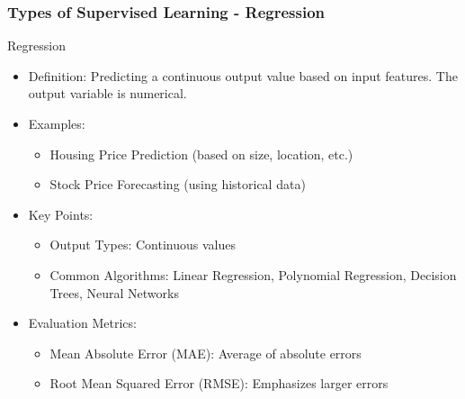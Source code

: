 \documentclass[aspectratio=169]{beamer}
\begin{document}
\begin{frame}[fragile]
    \frametitle{Types of Supervised Learning - Regression}
    \begin{block}{Regression}
        \begin{itemize}
            \item Definition: Predicting a continuous output value based on input features. The output variable is numerical.
            \item Examples:
                \begin{itemize}
                    \item Housing Price Prediction (based on size, location, etc.)
                    \item Stock Price Forecasting (using historical data)
                \end{itemize}
        \end{itemize}        
    \end{block}
    
    \begin{itemize}
        \item Key Points:
            \begin{itemize}
                \item Output Types: Continuous values
                \item Common Algorithms: Linear Regression, Polynomial Regression, Decision Trees, Neural Networks
            \end{itemize}
        \item Evaluation Metrics:
            \begin{itemize}
                \item Mean Absolute Error (MAE): Average of absolute errors
                \item Root Mean Squared Error (RMSE): Emphasizes larger errors
            \end{itemize}
    \end{itemize}
\end{frame}
\end{document}
